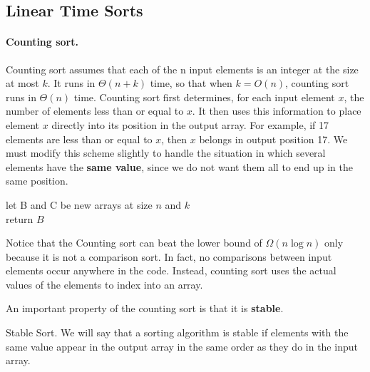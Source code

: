 

\subsection*{Linear Time Sorts}
\paragraph{ Counting sort.} Counting sort assumes that each of the n input elements is an integer at the size at most $k$. It runs in $\Theta \left(n + k\right)$ time, so that when $k = O(n)$, counting sort runs in $\Theta\left(n\right)$ time.
Counting sort first determines, for each input element $x$, the number of elements less than or equal to $x$. It then uses this information to place element $x$ directly into its position in the output array. For example, if 17 elements are less than or equal to $x$, then $x$ belongs in output position 17. We must modify this scheme slightly to handle the situation in which several elements have the \textbf{same value}, since we do not want them all to end up in the same position.


  \begin{algorithm}[H]
  	let B and C be new arrays at size $n$ and $k$ \\ 
	  return $B$
  \end{algorithm}


Notice that the Counting sort can beat the lower bound of $\Omega\left(n \log n\right)$ only because it is not a comparison sort. In fact, no comparisons between input elements occur anywhere in the code. Instead, counting sort uses the actual values of the elements to index into an array.

An important property of the counting sort is that it is \textbf{stable}.

\begin{defbox}{Stable Sort.}
 We will say that a sorting algorithm is stable if elements with the same value appear in the output array in the same order as they do in the input array. \end{defbox}

